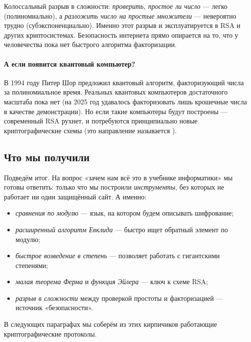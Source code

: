 \begin{importantbox}
Колоссальный разрыв в сложности: \emph{проверить, простое ли число} --- легко (полиномиально), а \emph{разложить число на простые множители} --- невероятно трудно (субэкспоненциально). Именно этот разрыв и эксплуатируется в RSA и других криптосистемах. Безопасность интернета прямо опирается на то, что у человечества пока нет быстрого алгоритма факторизации.
\end{importantbox}

\paragraph*{А если появится квантовый компьютер?} В 1994 году Питер Шор предложил квантовый алгоритм, факторизующий числа за полиномиальное время. Реальных квантовых компьютеров достаточного масштаба пока нет (на 2025 год удавалось факторизовать лишь крошечные числа в качестве демонстрации). Но если такие компьютеры будут построены --- современный RSA рухнет, и потребуются принципиально новые криптографические схемы (это направление называется ).

\subsection*{Что мы получили}

Подведём итог. На вопрос «зачем нам всё это в учебнике информатики» мы готовы ответить: только что мы построили \emph{инструменты}, без которых не работает ни один защищённый сайт. А именно:
\begin{itemize}
  \item \emph{сравнения по модулю} --- язык, на котором будем описывать шифрование;
  \item \emph{расширенный алгоритм Евклида} --- быстро ищет обратный элемент по модулю;
  \item \emph{быстрое возведение в степень} --- позволяет работать с гигантскими степенями;
  \item \emph{малая теорема Ферма} и \emph{функция Эйлера} --- ключ к схеме RSA;
  \item \emph{разрыв в сложности} между проверкой простоты и факторизацией --- источник «безопасности».
\end{itemize}

\noindent
В следующих параграфах мы соберём из этих кирпичиков работающие криптографические протоколы.

